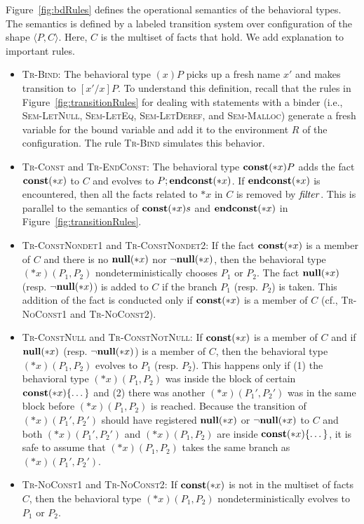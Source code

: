 Figure~\ref{fig:bdRules} defines the operational semantics of the
behavioral types.  The semantics is defined by a labeled transition
system over configuration of the shape $\langle P, C \rangle$.  Here,
$C$ is the multiset of facts that hold.  We add explanation to
important rules.
\begin{itemize}
 \item \textsc{Tr-Bind}: The behavioral type $(x)P$ picks up a fresh
       name $x'$ and makes transition to $[x'/x]P$.  To understand this
       definition, recall that the rules in
       Figure~\ref{fig:transitionRules} for dealing with statements with
       a binder (i.e., \textsc{Sem-LetNull}, \textsc{Sem-LetEq},
       \textsc{Sem-LetDeref}, and \textsc{Sem-Malloc}) generate a fresh
       variable for the bound variable and add it to the environment $R$
       of the configuration.  The rule \textsc{Tr-Bind} simulates this
       behavior.
 \item \textsc{Tr-Const} and \textsc{Tr-EndConst}: The behavioral type
       $\mathbf{const}(*x)P$ adds the fact $\mathbf{const}(*x)$ to $C$ and evolves to
       $P;\mathbf{endconst}(*x)$.  If $\mathbf{endconst}(*x)$ is encountered, then all the facts
       related to $*x$ in $C$ is removed by $\mathit{filter}$.  This is parallel
       to the semantics of $\mathbf{const}(*x)s$ and $\mathbf{endconst}(*x)$ in
       Figure~\ref{fig:transitionRules}.
 \item \textsc{Tr-ConstNondet1} and \textsc{Tr-ConstNondet2}: If the
       fact $\mathbf{const}(*x)$ is a member of $C$ and there is no $\mathbf{null}(*x)$
       nor $\neg\mathbf{null}(*x)$, then the behavioral type $(*x)(P_1,P_2)$
       nondeterministically chooses $P_1$ or $P_2$.  The fact
       $\mathbf{null}(*x)$ (resp. $\neg\mathbf{null}(*x)$) is added to $C$ if the branch
       $P_1$ (resp. $P_2$) is taken.  This addition of the fact is
       conducted only if $\mathbf{const}(*x)$ is a member of $C$ (cf.,
       \textsc{Tr-NoConst1} and \textsc{Tr-NoConst2}).
 \item \textsc{Tr-ConstNull} and \textsc{Tr-ConstNotNull}: If
       $\mathbf{const}(*x)$ is a member of $C$ and if $\mathbf{null}(*x)$ (resp.
       $\neg\mathbf{null}(*x)$) is a member of $C$, then the behavioral type
       $(*x)(P_1,P_2)$ evolves to $P_1$ (resp. $P_2$).  This happens
       only if (1) the behavioral type $(*x)(P_1,P_2)$ was inside the
       block of certain $\mathbf{const}(*x)\{\dots\}$ and (2) there was another
       $(*x)(P_1',P_2')$ was in the same block before $(*x)(P_1,P_2)$ is
       reached.  Because the transition of $(*x)(P_1',P_2')$ should have
       registered $\mathbf{null}(*x)$ or $\neg\mathbf{null}(*x)$ to $C$ and both
       $(*x)(P_1',P_2')$ and $(*x)(P_1,P_2)$ are inside
       $\mathbf{const}(*x)\{\dots\}$, it is safe to assume that $(*x)(P_1,P_2)$
       takes the same branch as $(*x)(P_1',P_2')$.
 \item \textsc{Tr-NoConst1} and \textsc{Tr-NoConst2}: If $\mathbf{const}(*x)$ is
       not in the multiset of facts $C$, then the behavioral type
       $(*x)(P_1,P_2)$ nondeterministically evolves to $P_1$ or $P_2$.
\end{itemize}

